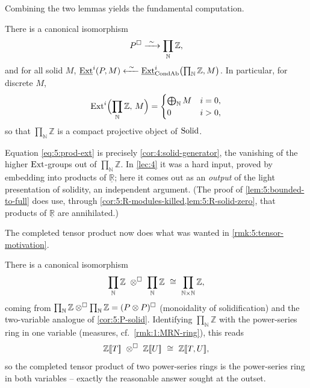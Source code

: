 Combining the two lemmas yields the fundamental computation.

\begin{corollary}
\label{cor:5:P-solid}
There is a canonical isomorphism
\begin{equation*}
P^{\solid}\xrightarrow{\ \sim\ }\prod_{\mathbb{N}}\mathbb{Z},
\end{equation*}
and for all solid $M$, $\iExt^{i}(P,M)\xleftarrow{\ \sim\ }\iExt^{i}_{\mathrm{CondAb}}
\bigl(\prod_{\mathbb{N}}\mathbb{Z},M\bigr)$. In particular, for discrete $M$,
\begin{equation}
\label{eq:5:prod-ext}
\operatorname{Ext}^{i}\Bigl(\prod_{\mathbb{N}}\mathbb{Z},\,M\Bigr)=
\begin{cases}
\bigoplus_{\mathbb{N}}M & i=0,\\
0 & i>0,
\end{cases}
\end{equation}
so that $\prod_{\mathbb{N}}\mathbb{Z}$ is a compact projective object of $\mathrm{Solid}$.
\end{corollary}

\begin{remark}
\label{rmk:5:independent-of-lec4}
Equation \eqref{eq:5:prod-ext} is precisely \cref{cor:4:solid-generator}, the
vanishing of the higher $\operatorname{Ext}$-groups out of $\prod_{\mathbb{N}}\mathbb{Z}$. In
\cref{lec:4} it was a hard input, proved by embedding into products of
$\underline{\mathbb{R}}$; here it comes out as an \emph{output} of the light
presentation of solidity, an independent argument. (The proof of
\cref{lem:5:bounded-to-full} does use, through
\cref{cor:5:R-modules-killed,lem:5:R-solid-zero}, that products of
$\underline{\mathbb{R}}$ are annihilated.)
\end{remark}

The completed tensor product now does what was wanted in
\cref{rmk:5:tensor-motivation}.

\begin{corollary}
\label{cor:5:tensor-square}
There is a canonical isomorphism
\begin{equation*}
\prod_{\mathbb{N}}\mathbb{Z}\ \otimes^{\solid}\ \prod_{\mathbb{N}}\mathbb{Z}
\ \cong\ \prod_{\mathbb{N}\times\mathbb{N}}\mathbb{Z},
\end{equation*}
coming from $\prod_{\mathbb{N}}\mathbb{Z}\otimes^{\square}\prod_{\mathbb{N}}\mathbb{Z}
=(P\otimes P)^{\square}$ (monoidality of solidification) and the two-variable
analogue of \cref{cor:5:P-solid}. Identifying
$\prod_{\mathbb{N}}\mathbb{Z}$ with the power-series ring in one variable (measures,
cf.\ \cref{rmk:1:MRN-ring}), this reads
\begin{equation*}
\mathbb{Z}[\![T]\!]\ \otimes^{\solid}\ \mathbb{Z}[\![U]\!]
\ \cong\ \mathbb{Z}[\![T,U]\!],
\end{equation*}
so the completed tensor product of two power-series rings is the power-series ring
in both variables -- exactly the reasonable answer sought at the outset.
\end{corollary}

